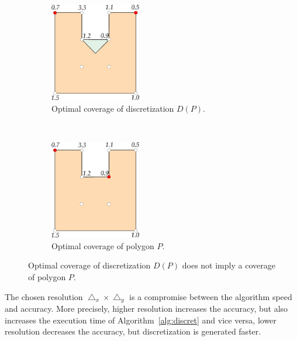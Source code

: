 \documentclass[runningheads,a4paper]{elsarticle}
\begin{document}
	\begin{figure}[t!]
    	\centering
    	\begin{subfigure}[t]{0.49\textwidth}
        	\centering
        	\includegraphics[height=1.7in]{slika1a.eps}
        	\caption{Optimal coverage of discretization $D(P)$. }
    	\end{subfigure}%
    	~
    	\begin{subfigure}[t]{0.49\textwidth}
        	\centering
        	\includegraphics[height=1.7in]{slika1b.eps}
        	\caption{Optimal coverage of polygon $P$.}
    	\end{subfigure}
    	\caption{Optimal coverage of discretization $D(P)$ does not imply a coverage of polygon $P$.}\label{fig:example}
	\end{figure}
	
	The chosen resolution  $\bigtriangleup_{x}\times\bigtriangleup_{y}$ is a compromise between the algorithm speed and accuracy. More precisely,  higher resolution increases the accuracy, but also increases the execution time of Algorithm~\ref{alg:discret} and vice versa, lower resolution decreases the accuracy, but discretization is  generated faster.
	
	
\end{document}
